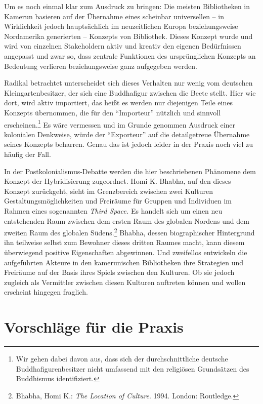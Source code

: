 \documentclass[a4paper,
fontsize=11pt,
oneside,
numbers=noperiodatend,
parskip=half-,
bibliography=totoc,
final
]{scrartcl}
\begin{document}
Um es noch einmal klar zum Ausdruck zu bringen: Die meisten Bibliotheken
in Kamerun basieren auf der Übernahme eines scheinbar universellen -- in
Wirklichkeit jedoch hauptsächlich im neuzeitlichen Europa
beziehungsweise Nordamerika generierten -- Konzepts von Bibliothek.
Dieses Konzept wurde und wird von einzelnen Stakeholdern aktiv und
kreativ den eigenen Bedürfnissen angepasst und zwar so, dass zentrale
Funktionen des ursprünglichen Konzepts an Bedeutung verlieren
beziehungsweise ganz aufgegeben werden.

Radikal betrachtet unterscheidet sich dieses Verhalten nur wenig vom
deutschen Kleingartenbesitzer, der sich eine Buddhafigur zwischen die
Beete stellt. Hier wie dort, wird aktiv importiert, das heißt es werden
nur diejenigen Teile eines Konzepts übernommen, die für den
\enquote{Importeur} nützlich und sinnvoll erscheinen.\footnote{Wir gehen
  dabei davon aus, dass sich der durchschnittliche deutsche
  Buddhafigurenbesitzer nicht umfassend mit den religiösen Grundsätzen
  des Buddhismus identifiziert.} Es wäre vermessen und im Grunde
genommen Ausdruck einer kolonialen Denkweise, würde der
\enquote{Exporteur} auf die detailgetreue Übernahme seines Konzepts
beharren. Genau das ist jedoch leider in der Praxis noch viel zu häufig
der Fall.

In der Postkolonialismus-Debatte werden die hier beschriebenen Phänomene
dem Konzept der Hybridisierung zugeordnet. Homi K. Bhabha, auf den
dieses Konzept zurückgeht, sieht im Grenzbereich zwischen zwei Kulturen
Gestaltungsmöglichkeiten und Freiräume für Gruppen und Individuen im
Rahmen eines sogenannten \emph{Third Space.} Es handelt sich um einen
neu entstehenden Raum zwischen dem ersten Raum des globalen Nordens und
dem zweiten Raum des globalen Südens.\footnote{Bhabha, Homi K.:
  \emph{The Location of Culture}. 1994. London: Routledge.} Bhabha,
dessen biographischer Hintergrund ihn teilweise selbst zum Bewohner
dieses dritten Raumes macht, kann diesem überwiegend positive
Eigenschaften abgewinnen. Und zweifellos entwickeln die aufgeführten
Akteure in den kamerunischen Bibliotheken ihre Strategien und Freiräume
auf der Basis ihres Spiels zwischen den Kulturen. Ob sie jedoch zugleich
als Vermittler zwischen diesen Kulturen auftreten können und wollen
erscheint hingegen fraglich.

\section*{Vorschläge für die
Praxis}\label{vorschluxe4ge-fuxfcr-die-praxis}
\end{document}
